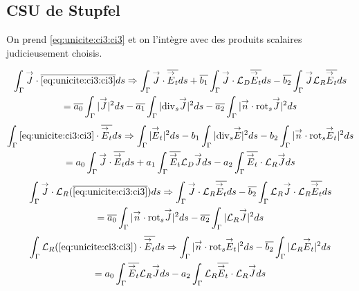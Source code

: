 

\subsection{CSU de Stupfel}

  On prend \eqref{eq:unicite:ci3:ci3} et on l’intègre avec des produits scalaires judicieusement choisis.

  \begin{multline}
    \label{eq:unicite:ci3:csu3-1}
    \int_\Gamma \vJ\cdot\conj{\eqref{eq:unicite:ci3:ci3}}ds \Rightarrow
    \int_\Gamma \vJ \cdot \conj{\vE_t} ds  + \conj{b_1} \int_\Gamma \vJ\cdot \LD\conj{\vE_t} ds - \conj{b_2} \int_\Gamma \vJ \LR\conj{\vE_t} ds \\
    = \conj{a_0} \int_\Gamma |\vJ|^2ds - \conj{a_1} \int_\Gamma |\tdivs \vJ|^2 ds - \conj{a_2} \int_\Gamma |\vn \cdot \trots \vJ|^2 ds
  \end{multline}
  \begin{multline}
    \label{eq:unicite:ci3:csu3-2}
    \int_\Gamma \eqref{eq:unicite:ci3:ci3} \cdot \conj{\vE_t} ds \Rightarrow
    \int_\Gamma |\vE_t|^2 ds  - b_1 \int_\Gamma | \tdivs \vE |^2 ds - b_2 \int_\Gamma | \vn \cdot \trots \vE_t|^2 ds \\
    = a_0 \int_\Gamma \vJ\cdot \conj{\vE_t}ds + a_1 \int_\Gamma \conj{\vE_t} \LD \vJ ds - a_2 \int_\Gamma \conj{\vE_t} \cdot \LR \vJ ds
  \end{multline}
  \begin{multline}
    \label{eq:unicite:ci3:csu3-3}
    \int_\Gamma \vJ \cdot \LR ( \conj{\eqref{eq:unicite:ci3:ci3}} ) ds \Rightarrow
    \int_\Gamma \vJ \cdot \LR \conj{\vE_t} ds  - \conj{b_2} \int_\Gamma \LR \vJ \cdot \LR \conj{\vE_t} ds \\
    =  \conj{a_0} \int_\Gamma |\vn \cdot \trots \vJ|^2ds - \conj{a_2} \int_\Gamma | \LR \vJ|^2 ds
  \end{multline}
  \begin{multline}
    \label{eq:unicite:ci3:csu3-4}
    \int_\Gamma  \LR ( \eqref{eq:unicite:ci3:ci3} ) \cdot \conj{\vE_t} ds \Rightarrow
    \int_\Gamma | \vn \cdot \trots \vE_t |^2 ds  - \conj{b_2} \int_\Gamma | \LR \vE_t|^2 ds \\
    = a_0 \int_\Gamma \conj{\vE_t} \LR \vJ ds - a_2 \int_\Gamma \LR \conj{\vE_t} \cdot \LR \vJ ds
  \end{multline}
